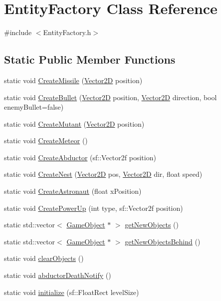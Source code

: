 \hypertarget{class_entity_factory}{}\section{Entity\+Factory Class Reference}
\label{class_entity_factory}


{\ttfamily \#include $<$Entity\+Factory.\+h$>$}

\subsection*{Static Public Member Functions}
\begin{DoxyCompactItemize}
\item 
static void \hyperlink{class_entity_factory_a09b1b21ae968b6db79f63824f9488091}{Create\+Missile} (\hyperlink{class_vector2_d}{Vector2D} position)
\item 
static void \hyperlink{class_entity_factory_a12afa2409278355f081201d888af9467}{Create\+Bullet} (\hyperlink{class_vector2_d}{Vector2D} position, \hyperlink{class_vector2_d}{Vector2D} direction, bool enemy\+Bullet=false)
\item 
static void \hyperlink{class_entity_factory_a9aa7edc76e6f6ee4158ae78b780f1e18}{Create\+Mutant} (\hyperlink{class_vector2_d}{Vector2D} position)
\item 
static void \hyperlink{class_entity_factory_a679ed3727e2f00e4fe15576c7fd5144d}{Create\+Meteor} ()
\item 
static void \hyperlink{class_entity_factory_a900ad8e29d0d8f27e6b4c981f25a7a58}{Create\+Abductor} (sf\+::\+Vector2f position)
\item 
static void \hyperlink{class_entity_factory_a855dd969520879d9ea167d854ca30c11}{Create\+Nest} (\hyperlink{class_vector2_d}{Vector2D} pos, \hyperlink{class_vector2_d}{Vector2D} dir, float speed)
\item 
static void \hyperlink{class_entity_factory_a825d95311fabc8edee88c6dda69346f4}{Create\+Astronaut} (float x\+Position)
\item 
static void \hyperlink{class_entity_factory_a3d50f46ea571447791681e0799fe7056}{Create\+Power\+Up} (int type, sf\+::\+Vector2f position)
\item 
static std\+::vector$<$ \hyperlink{class_game_object}{Game\+Object} $\ast$ $>$ \hyperlink{class_entity_factory_ab67a24301fabebc078f219c7e9e8c4fb}{get\+New\+Objects} ()
\item 
static std\+::vector$<$ \hyperlink{class_game_object}{Game\+Object} $\ast$ $>$ \hyperlink{class_entity_factory_a01479e6b22f3db318007b1dbc4e85058}{get\+New\+Objects\+Behind} ()
\item 
static void \hyperlink{class_entity_factory_a242fb009eda7ff8ff51025fd3d6a1e23}{clear\+Objects} ()
\item 
static void \hyperlink{class_entity_factory_ad55d3285456e3d8e03d27d274ac60d00}{abductor\+Death\+Notify} ()
\item 
static void \hyperlink{class_entity_factory_a7a2d1bf2e09b30ae6db3ee7f060763d8}{initialize} (sf\+::\+Float\+Rect level\+Size)
\end{DoxyCompactItemize}


